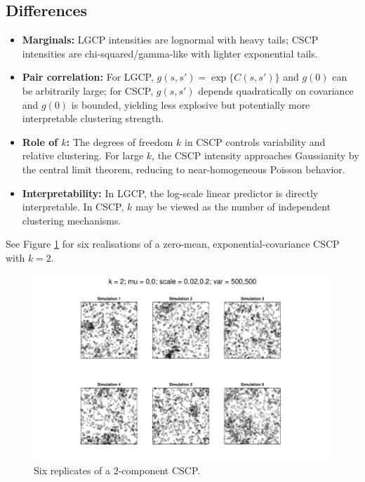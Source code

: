 \documentclass[11pt]{article}
\begin{document}
	\subsection*{Differences}
	\begin{itemize}
		\item \textbf{Marginals:} LGCP intensities are lognormal with heavy tails; CSCP intensities are chi-squared/gamma-like with lighter exponential tails.
		\item \textbf{Pair correlation:} For LGCP, $g(s,s') = \exp\{ C(s,s') \}$ and $g(0)$ can be arbitrarily large; for CSCP, $g(s,s')$ depends quadratically on covariance and $g(0)$ is bounded, yielding less explosive but potentially more interpretable clustering strength.
		\item \textbf{Role of $k$:} The degrees of freedom $k$ in CSCP controls variability and relative clustering. For large $k$, the CSCP intensity approaches Gaussianity by the central limit theorem, reducing to near-homogeneous Poisson behavior.
		\item \textbf{Interpretability:} In LGCP, the log-scale linear predictor is directly interpretable. In CSCP, $k$ may be viewed as the number of independent clustering mechanisms.
	\end{itemize}
	
	
%	

See Figure \ref{fig:basic} for six realisations of a zero-mean, exponential-covariance CSCP with $k=2$.

\begin{figure}
	\includegraphics[width=1\textwidth]{fig_basic.pdf}
	\caption{Six replicates of a 2-component CSCP.}\label{fig:basic}
\end{figure}
\end{document}

